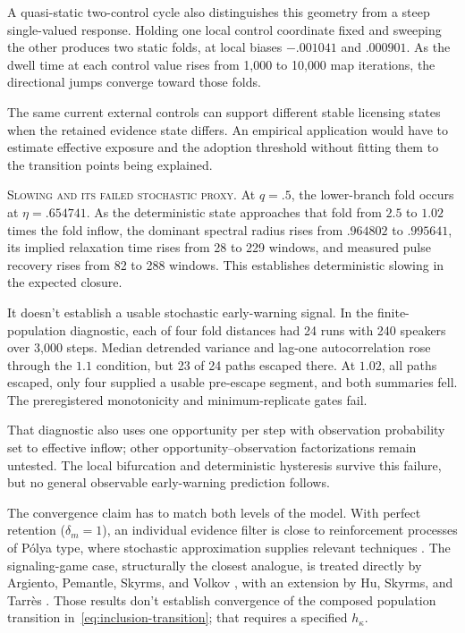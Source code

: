 A quasi-static two-control cycle also distinguishes this geometry from a steep
single-valued response. Holding one local control coordinate fixed and sweeping
the other produces two static folds, at local biases $-.001041$ and $.000901$.
As the dwell time at each control value rises from 1{,}000 to 10{,}000 map
iterations, the directional jumps converge toward those folds.

The same current external controls can support different stable licensing
states when the retained evidence state differs. An empirical application would
have to estimate effective exposure and the adoption threshold without fitting
them to the transition points being explained.

\noindent\textsc{Slowing and its failed stochastic proxy.} At $q=.5$, the
lower-branch fold occurs at $\eta=.654741$. As the deterministic state approaches
that fold from $2.5$ to $1.02$ times the fold inflow, the dominant spectral
radius rises from $.964802$ to $.995641$, its implied relaxation time rises from
28 to 229 windows, and measured pulse recovery rises from 82 to 288 windows.
This establishes deterministic slowing in the expected closure.

It doesn't establish a usable stochastic early-warning signal. In the
finite-population diagnostic, each of four fold distances had 24 runs with 240
speakers over 3{,}000 steps. Median detrended variance and lag-one
autocorrelation rose through the $1.1$ condition, but 23 of 24 paths escaped
there. At $1.02$, all paths escaped, only four supplied a usable pre-escape
segment, and both summaries fell. The preregistered monotonicity and
minimum-replicate gates fail.

That diagnostic also uses one opportunity per step with observation probability
set to effective inflow; other opportunity--observation factorizations remain
untested. The local
bifurcation and deterministic hysteresis survive this failure, but no general
observable early-warning prediction follows.

The convergence claim has to match both levels of the model. With perfect
retention ($\delta_m=1$), an individual evidence filter is close to
reinforcement processes of Pólya type, where stochastic approximation supplies
relevant techniques \citep{pemantle2007}. The signaling-game case,
structurally the closest analogue, is treated directly by Argiento, Pemantle,
Skyrms, and Volkov \citep{argiento2009}, with an extension by Hu, Skyrms,
and Tarrès \citep{huSkyrmsTarres2011}. Those results don't establish
convergence of the composed population transition
in~\eqref{eq:inclusion-transition}; that requires a specified $h_\kappa$.

